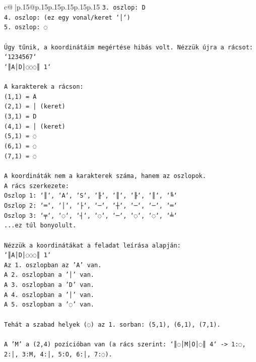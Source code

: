 \documentclass{article}
\begin{document}
{\begin{supertabular}{c@{$\;$}|p{.15\linewidth}@{}p{.15\linewidth}p{.15\linewidth}p{.15\linewidth}p{.15\linewidth}p{.15\linewidth}}
{{{\texttt{3. oszlop: D} \\
\texttt{4. oszlop: (ez egy vonal/keret `│`)} \\
\texttt{5. oszlop: ◌} \\
\\ 
\texttt{Úgy tűnik, a koordinátáim megértése hibás volt. Nézzük újra a rácsot:} \\
\texttt{`1234567`} \\
\texttt{`║A│D│◌◌◌║ 1`} \\
\\ 
\texttt{A karakterek a rácson:} \\
\texttt{(1,1) = A} \\
\texttt{(2,1) = │ (keret)} \\
\texttt{(3,1) = D} \\
\texttt{(4,1) = │ (keret)} \\
\texttt{(5,1) = ◌} \\
\texttt{(6,1) = ◌} \\
\texttt{(7,1) = ◌} \\
\\ 
\texttt{A koordináták nem a karakterek száma, hanem az oszlopok.} \\
\texttt{A rács szerkezete:} \\
\texttt{Oszlop 1: `║`, `A`, `S`, `╟`, `║`, `╟`, `║`, `╚`} \\
\texttt{Oszlop 2: `═`, `│`, `├`, `─`, `┼`, `─`, `─`, `═`} \\
\texttt{Oszlop 3: `╤`, `◌`, `┤`, `◌`, `─`, `◌`, `◌`, `╧`} \\
\texttt{...ez túl bonyolult.} \\
\\ 
\texttt{Nézzük a koordinátákat a feladat leírása alapján:} \\
\texttt{`║A│D│◌◌◌║ 1`} \\
\texttt{Az 1. oszlopban az 'A' van.} \\
\texttt{A 2. oszlopban a '│' van.} \\
\texttt{A 3. oszlopban a 'D' van.} \\
\texttt{A 4. oszlopban a '│' van.} \\
\texttt{A 5. oszlopban a '◌' van.} \\
\\ 
\texttt{Tehát a szabad helyek (◌) az 1. sorban: (5,1), (6,1), (7,1).} \\
\\ 
\texttt{A 'M' a (2,4) pozícióban van (a rács szerint: `║◌│M│O│◌║ 4` {-}> 1:◌, 2:│, 3:M, 4:│, 5:O, 6:│, 7:◌).} \\
}}}
\end{supertabular}}
\end{document}
